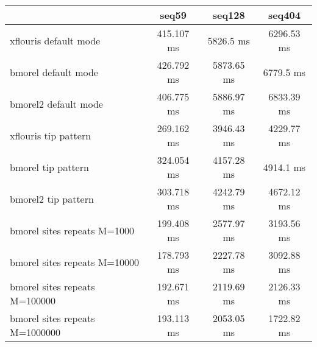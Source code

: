 \begin{tabular}{|l|c|c|c|}
\hline
 & seq59 & seq128 & seq404 \\
\hline
xflouris default mode & 415.107 ms & 5826.5 ms & 6296.53 ms\\
\hline
bmorel default mode & 426.792 ms & 5873.65 ms & 6779.5 ms\\
\hline
bmorel2 default mode & 406.775 ms & 5886.97 ms & 6833.39 ms\\
\hline
xflouris tip pattern & 269.162 ms & 3946.43 ms & 4229.77 ms\\
\hline
bmorel tip pattern & 324.054 ms & 4157.28 ms & 4914.1 ms\\
\hline
bmorel2 tip pattern & 303.718 ms & 4242.79 ms & 4672.12 ms\\
\hline
bmorel sites repeats M=1000 & 199.408 ms & 2577.97 ms & 3193.56 ms\\
\hline
bmorel sites repeats M=10000 & 178.793 ms & 2227.78 ms & 3092.88 ms\\
\hline
bmorel sites repeats M=100000 & 192.671 ms & 2119.69 ms & 2126.33 ms\\
\hline
bmorel sites repeats M=1000000 & 193.113 ms & 2053.05 ms & 1722.82 ms\\
\hline
\end{tabular}

